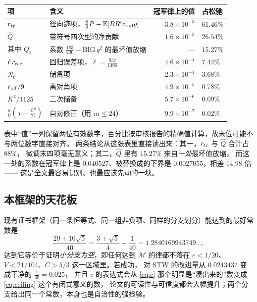 \documentclass[UTF8,11pt]{ctexart}
\newcommand{\E}{\mathbb{E}}
\newcommand{\M}{\mathcal{M}}
\begin{document}
\begin{center}
\small
\begin{tabular}{llrl}
\toprule
项 & 含义 & 冠军律上的值 & 占松驰 \\
\midrule
$r_{\rm tr}$ & 径向迹项，$\frac89P-\E[RR'z_{\rm rad}g]$ & $3.8\times10^{-3}$ & $61.46\%$ \\
$\widehat Q$ & 带符号四次型的净贡献 & $1.6\times10^{-3}$ & $26.54\%$ \\
\quad 其中 $Q_3$ & 系数 $\frac{183}{200}-\mathrm{BIG}\,q^2$ 的最坏值放缩 & --- & $15.27\%$ \\
$\ell\, r_{\rm reg}$ & 回归误差项，$\ell=\frac{937}{1400}$ & $4.6\times10^{-4}$ & $7.44\%$ \\
$\mathcal R_0$ & 储备项 & $2.3\times10^{-4}$ & $3.68\%$ \\
$r_{\rm off}/9$ & 离对角项 & $4.9\times10^{-5}$ & $0.78\%$ \\
$K^2/1125$ & 二次储备 & $5.7\times10^{-6}$ & $0.09\%$ \\
$\frac\kappa9(\chi-\frac{C^2}{24})$ & 自对修正（用 $m\le24$） & $9.9\times10^{-7}$ & $0.02\%$ \\
\bottomrule
\end{tabular}
\end{center}

\noindent 表中``值''一列保留两位有效数字，百分比按审核报告的精确值计算，故末位可能不与两位数字直接对齐。
两条结论从这张表里直接读出来：其一，$r_{\rm tr}$ 与 $\widehat Q$ 合计占 $88\%$，
微调末四项毫无意义；其二，$\widehat Q$ 里有 $15.27\%$ 来自\emph{一处}最坏值放缩，
而这一处的系数在冠军律上是 $0.040527$、被替换成的下界是 $0.0027055$，相差 $14.98$ 倍——
这是全文最容易识别、也最应该先动的一块。

\subsection{本框架的天花板}

现有证书框架（同一条恒等式、同一组非负项、同样的分支划分）能达到的最好常数是
\begin{equation}\label{eq:ceiling}
 \frac{29+10\sqrt5}{40}=\frac{3+\sqrt5}{4}-\frac1{40}=1.2840169943749\ldots ,
\end{equation}
达到它等价于证明\emph{小分支为空}，即任何达到 $\M$ 的律都不落在
$e<1/20$、$V<21/104$、$C>5/3$ 这一区域里。若成功，
对 STW 的改进量从 $0.0243437$ 变成干净的 $\frac1{40}=0.025$，
并且 $c$ 的表达式会从 \eqref{eq:c} 那个明显是``凑出来的''数变成 \eqref{eq:ceiling} 这个有闭式意义的数，
论文的可读性与可信度都会大幅提升；两个分支给出同一个常数，本身也是自洽性的强检验。
\end{document}
